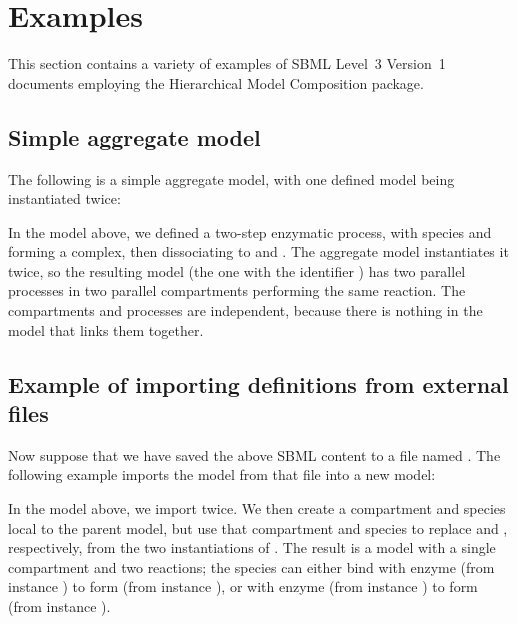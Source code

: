 
\section{Examples}
\label{examples}

This section contains a variety of examples of SBML Level~3 Version~1
documents employing the Hierarchical Model Composition package.

\subsection{Simple aggregate model}

The following is a simple aggregate model, with one defined model being
instantiated twice:


In the model above, we defined a two-step enzymatic process, with
species  and  forming a complex, then dissociating to
 and .  The aggregate model instantiates it twice, so the
resulting model (the one with the identifier ) has two
parallel processes in two parallel compartments performing the same
reaction.  The compartments and processes are independent, because there
is nothing in the model that links them together.


\subsection{Example of importing definitions from external files}

Now suppose that we have saved the above SBML content to a file named
.  The following example imports the model
 from that file into a new model:


In the model above, we import  twice.  We then create a
compartment and species local to the parent model, but use that
compartment and species to replace  and , respectively,
from the two instantiations of .  The result is a model with
a single compartment and two reactions; the species  can either
bind with enzyme  (from instance ) to form  (from
instance ), or with enzyme  (from instance ) to
form  (from instance ).


